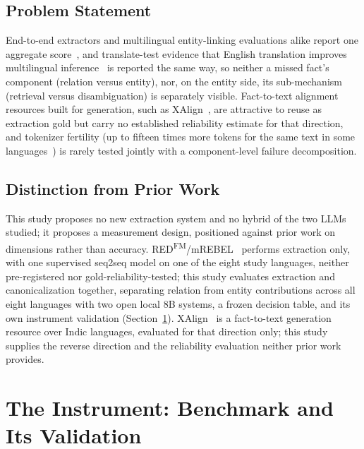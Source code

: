 \documentclass{llncs}
\begin{document}
\subsection{Problem Statement}\label{sec:problem}
End-to-end
extractors and multilingual entity-linking evaluations alike report one
aggregate
score~\cite{huguetcabot2023redfm,huguetcabot2021rebel,wu2020blink,botha2020entitylinking100},
and translate-test evidence that English translation improves multilingual
inference~\cite{etxaniz2024think} is reported the same way, so neither a
missed fact's component (relation versus entity), nor, on the entity side,
its sub-mechanism (retrieval versus disambiguation) is separately visible.
Fact-to-text alignment resources built for generation, such as
XAlign~\cite{abhishek2022xalign}, are attractive to reuse as extraction
gold but carry no established reliability estimate for that direction, and tokenizer fertility (up to
fifteen times more tokens for the same text in some
languages~\cite{petrov2023tokenizers}) is rarely tested jointly with a
component-level failure decomposition.

\subsection{Distinction from Prior Work}\label{sec:distinction}
This study proposes no new extraction system and no hybrid of the two LLMs
studied; it proposes a measurement design, positioned against prior work on
dimensions rather than accuracy.
RED\textsuperscript{FM}/mREBEL~\cite{huguetcabot2023redfm}
performs extraction only, with one supervised seq2seq model on one of the
eight study languages, neither pre-registered nor gold-reliability-tested;
this study evaluates extraction and canonicalization together, separating
relation from entity contributions across all eight languages with two
open local 8B systems, a frozen decision table, and its own instrument
validation (Section~\ref{sec:instrument}).
XAlign~\cite{abhishek2022xalign} is a fact-to-text generation resource over
Indic languages, evaluated for that direction only; this study
supplies the reverse direction and the reliability evaluation neither prior
work provides.

\section{The Instrument: Benchmark and Its Validation}\label{sec:instrument}
\end{document}
